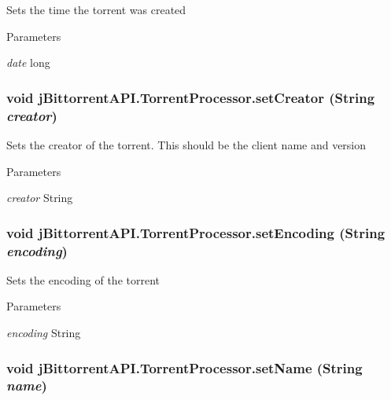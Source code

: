 Sets the time the torrent was created 
\begin{DoxyParams}{Parameters}
\item[{\em date}]long \end{DoxyParams}
\hypertarget{classj_bittorrent_a_p_i_1_1_torrent_processor_a7529a38cb49a64af62aeb78d84173db4}{
\subsubsection[{setCreator}]{\setlength{\rightskip}{0pt plus 5cm}void jBittorrentAPI.TorrentProcessor.setCreator (String {\em creator})}}
\label{classj_bittorrent_a_p_i_1_1_torrent_processor_a7529a38cb49a64af62aeb78d84173db4}
Sets the creator of the torrent. This should be the client name and version 
\begin{DoxyParams}{Parameters}
\item[{\em creator}]String \end{DoxyParams}
\hypertarget{classj_bittorrent_a_p_i_1_1_torrent_processor_a8a1107ff400760964bed5143255aa006}{
\subsubsection[{setEncoding}]{\setlength{\rightskip}{0pt plus 5cm}void jBittorrentAPI.TorrentProcessor.setEncoding (String {\em encoding})}}
\label{classj_bittorrent_a_p_i_1_1_torrent_processor_a8a1107ff400760964bed5143255aa006}
Sets the encoding of the torrent 
\begin{DoxyParams}{Parameters}
\item[{\em encoding}]String \end{DoxyParams}
\hypertarget{classj_bittorrent_a_p_i_1_1_torrent_processor_a4ab8920ed8edfa98737326904433ecc6}{
\subsubsection[{setName}]{\setlength{\rightskip}{0pt plus 5cm}void jBittorrentAPI.TorrentProcessor.setName (String {\em name})}}

